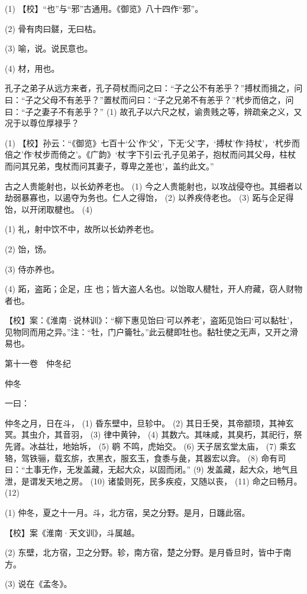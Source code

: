 \documentclass[12pt,UTF8]{ctexbook}
\begin{document}
(1) 【校】“也”与“邪”古通用。《御览》八十四作“邪”。

(2) 骨有肉曰髊，无曰枯。

(3) 喻，说。说民意也。

(4) 材，用也。

孔子之弟子从远方来者，孔子荷杖而问之曰：“子之公不有恙乎？”搏杖而揖之，问曰：“子之父母不有恙乎？”置杖而问曰：“子之兄弟不有恙乎？”杙步而倍之，问曰：“子之妻子不有恙乎？” (1) 故孔子以六尺之杖，谕贵贱之等，辨疏亲之义，又况于以尊位厚禄乎？

(1) 【校】孙云：“《御览》七百十‘公’作‘父’，下无‘父’字，‘搏杖’作‘持杖’，‘杙步而倍之’作‘杖步而倚之’。《广韵》‘杖’字下引云‘孔子见弟子，抱杖而问其父母，柱杖而问其兄弟，曳杖而问其妻子，尊卑之差也’，盖约此文。”

古之人贵能射也，以长幼养老也。 (1) 今之人贵能射也，以攻战侵夺也。其细者以劫弱暴寡也，以遏夺为务也。仁人之得饴， (2) 以养疾侍老也。 (3) 跖与企足得饴，以开闭取楗也。 (4)

(1) 礼，射中饮不中，故所以长幼养老也。

(2) 饴，饧。

(3) 侍亦养也。

(4) 跖，盗跖；企足，庄 也；皆大盗人名也。以饴取人楗牡，开人府藏，窃人财物者也。

【校】案：《淮南·说林训》：“柳下惠见饴曰‘可以养老’，盗跖见饴曰‘可以黏牡’，见物同而用之异。”注：“牡，门户籥牡。”此云楗即牡也。黏牡使之无声，又开之滑易也。





第十一卷　仲冬纪



仲冬


一曰：

仲冬之月，日在斗， (1) 昏东壁中，旦轸中。 (2) 其日壬癸，其帝颛顼，其神玄冥。其虫介，其音羽， (3) 律中黄钟， (4) 其数六。其味咸，其臭朽，其祀行，祭先肾。冰益壮，地始坼， (5) 鹖 不鸣，虎始交。 (6) 天子居玄堂太庙， (7) 乘玄辂，驾铁骊，载玄旂，衣黑衣，服玄玉，食黍与彘，其器宏以弇。 (8) 命有司曰：“土事无作，无发盖藏，无起大众，以固而闭。” (9) 发盖藏，起大众，地气且泄，是谓发天地之房。 (10) 诸蛰则死，民多疾疫，又随以丧， (11) 命之曰畅月。 (12)

(1) 仲冬，夏之十一月。斗，北方宿，吴之分野。是月，日躔此宿。

【校】案《淮南·天文训》，斗属越。

(2) 东壁，北方宿，卫之分野。轸，南方宿，楚之分野。是月昏旦时，皆中于南方。

(3) 说在《孟冬》。
\end{document}
